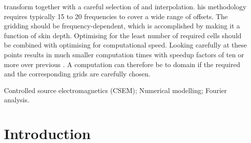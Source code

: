 \documentclass[extra, camera,%
    final,       %
]{gji}
\begin{document}
\begin{summary}
transform together with a careful selection of  and interpolation. his methodology requires typically 15 to 20 frequencies to cover a
wide range of offsets.
%
The gridding should be frequency-dependent, which is
accomplished by making it a function of skin depth. Optimising for the least
number of required cells  should be combined
with optimising for computational speed.
%
Looking carefully at these  points results in much smaller
computation times with speedup factors of ten or more over previous
. A  computation
 can
therefore be  to domain  if the required
 and the corresponding grids are
carefully chosen.
%
\end{summary}

\begin{keywords}
  Controlled source electromagnetics (CSEM); Numerical modelling; Fourier analysis.
\end{keywords}

\section{Introduction}  %
\end{document}

